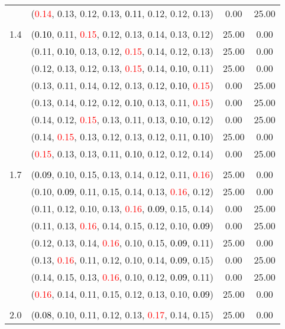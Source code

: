 \documentclass[10pt,a4paper]{report}
\begin{document}
\begin{center}
\begin{longtable}{clcc}
			&(\textcolor{red}{0.14}, 0.13, 0.12, 0.13, \textcolor{black}{0.11}, 0.12, 0.12, 0.13)&0.00&25.00\\
		&&&\\
		1.4			&(\textcolor{black}{0.10}, 0.11, \textcolor{red}{0.15}, 0.12, 0.13, 0.14, 0.13, 0.12)&25.00&0.00\\
			&(0.11, \textcolor{black}{0.10}, 0.13, 0.12, \textcolor{red}{0.15}, 0.14, 0.12, 0.13)&25.00&0.00\\
			&(0.12, 0.13, 0.12, 0.13, \textcolor{red}{0.15}, 0.14, \textcolor{black}{0.10}, 0.11)&25.00&0.00\\
			&(0.13, 0.11, 0.14, 0.12, 0.13, 0.12, \textcolor{black}{0.10}, \textcolor{red}{0.15})&0.00&25.00\\
			&(0.13, 0.14, 0.12, 0.12, \textcolor{black}{0.10}, 0.13, 0.11, \textcolor{red}{0.15})&0.00&25.00\\
			&(0.14, 0.12, \textcolor{red}{0.15}, 0.13, 0.11, 0.13, \textcolor{black}{0.10}, 0.12)&0.00&25.00\\
			&(0.14, \textcolor{red}{0.15}, 0.13, 0.12, 0.13, 0.12, 0.11, \textcolor{black}{0.10})&25.00&0.00\\
			&(\textcolor{red}{0.15}, 0.13, 0.13, 0.11, \textcolor{black}{0.10}, 0.12, 0.12, 0.14)&0.00&25.00\\
		&&&\\
		1.7			&(\textcolor{black}{0.09}, 0.10, 0.15, 0.13, 0.14, 0.12, 0.11, \textcolor{red}{0.16})&25.00&0.00\\
			&(0.10, \textcolor{black}{0.09}, 0.11, 0.15, 0.14, 0.13, \textcolor{red}{0.16}, 0.12)&25.00&0.00\\
			&(0.11, 0.12, 0.10, 0.13, \textcolor{red}{0.16}, \textcolor{black}{0.09}, 0.15, 0.14)&0.00&25.00\\
			&(0.11, 0.13, \textcolor{red}{0.16}, 0.14, 0.15, 0.12, 0.10, \textcolor{black}{0.09})&0.00&25.00\\
			&(0.12, 0.13, 0.14, \textcolor{red}{0.16}, 0.10, 0.15, \textcolor{black}{0.09}, 0.11)&25.00&0.00\\
			&(0.13, \textcolor{red}{0.16}, 0.11, 0.12, 0.10, 0.14, \textcolor{black}{0.09}, 0.15)&0.00&25.00\\
			&(0.14, 0.15, 0.13, \textcolor{red}{0.16}, 0.10, 0.12, \textcolor{black}{0.09}, 0.11)&0.00&25.00\\
			&(\textcolor{red}{0.16}, 0.14, 0.11, 0.15, 0.12, 0.13, 0.10, \textcolor{black}{0.09})&25.00&0.00\\
		&&&\\
		2.0			&(\textcolor{black}{0.08}, 0.10, 0.11, 0.12, 0.13, \textcolor{red}{0.17}, 0.14, 0.15)&25.00&0.00\\

\end{longtable}
\end{center}
\end{document}
